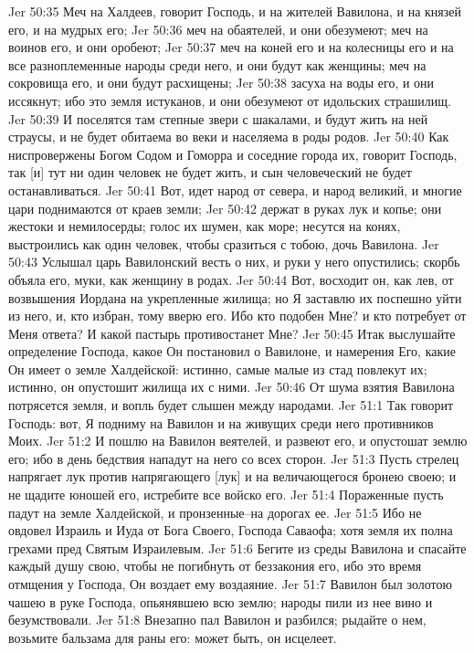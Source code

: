 Jer 50:35  Меч на Халдеев, говорит Господь, и на жителей Вавилона, и на князей его, и на мудрых его;
Jer 50:36  меч на обаятелей, и они обезумеют; меч на воинов его, и они оробеют;
Jer 50:37  меч на коней его и на колесницы его и на все разноплеменные народы среди него, и они будут как женщины; меч на сокровища его, и они будут расхищены;
Jer 50:38  засуха на воды его, и они иссякнут; ибо это земля истуканов, и они обезумеют от идольских страшилищ.
Jer 50:39  И поселятся там степные звери с шакалами, и будут жить на ней страусы, и не будет обитаема во веки и населяема в роды родов.
Jer 50:40  Как ниспровержены Богом Содом и Гоморра и соседние города их, говорит Господь, так [и] тут ни один человек не будет жить, и сын человеческий не будет останавливаться.
Jer 50:41  Вот, идет народ от севера, и народ великий, и многие цари поднимаются от краев земли;
Jer 50:42  держат в руках лук и копье; они жестоки и немилосерды; голос их шумен, как море; несутся на конях, выстроились как один человек, чтобы сразиться с тобою, дочь Вавилона.
Jer 50:43  Услышал царь Вавилонский весть о них, и руки у него опустились; скорбь объяла его, муки, как женщину в родах.
Jer 50:44  Вот, восходит он, как лев, от возвышения Иордана на укрепленные жилища; но Я заставлю их поспешно уйти из него, и, кто избран, тому вверю его. Ибо кто подобен Мне? и кто потребует от Меня ответа? И какой пастырь противостанет Мне?
Jer 50:45  Итак выслушайте определение Господа, какое Он постановил о Вавилоне, и намерения Его, какие Он имеет о земле Халдейской: истинно, самые малые из стад повлекут их; истинно, он опустошит жилища их с ними.
Jer 50:46  От шума взятия Вавилона потрясется земля, и вопль будет слышен между народами.
Jer 51:1  Так говорит Господь: вот, Я подниму на Вавилон и на живущих среди него противников Моих.
Jer 51:2  И пошлю на Вавилон веятелей, и развеют его, и опустошат землю его; ибо в день бедствия нападут на него со всех сторон.
Jer 51:3  Пусть стрелец напрягает лук против напрягающего [лук] и на величающегося бронею своею; и не щадите юношей его, истребите все войско его.
Jer 51:4  Пораженные пусть падут на земле Халдейской, и пронзенные--на дорогах ее.
Jer 51:5  Ибо не овдовел Израиль и Иуда от Бога Своего, Господа Саваофа; хотя земля их полна грехами пред Святым Израилевым.
Jer 51:6  Бегите из среды Вавилона и спасайте каждый душу свою, чтобы не погибнуть от беззакония его, ибо это время отмщения у Господа, Он воздает ему воздаяние.
Jer 51:7  Вавилон был золотою чашею в руке Господа, опьянявшею всю землю; народы пили из нее вино и безумствовали.
Jer 51:8  Внезапно пал Вавилон и разбился; рыдайте о нем, возьмите бальзама для раны его: может быть, он исцелеет.
